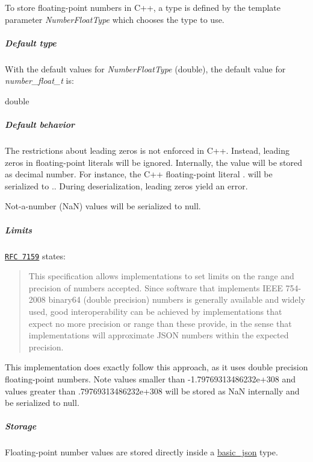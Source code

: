 To store floating-\/point numbers in C++, a type is defined by the template parameter {\itshape Number\+Float\+Type} which chooses the type to use.

\subparagraph*{Default type}

With the default values for {\itshape Number\+Float\+Type} ({\ttfamily double}), the default value for {\itshape number\+\_\+float\+\_\+t} is\+:


\begin{DoxyCode}
\textcolor{keywordtype}{double}
\end{DoxyCode}


\subparagraph*{Default behavior}


\begin{DoxyItemize}
\item The restrictions about leading zeros is not enforced in C++. Instead, leading zeros in floating-\/point literals will be ignored. Internally, the value will be stored as decimal number. For instance, the C++ floating-\/point literal {.} will be serialized to {.}. During deserialization, leading zeros yield an error.
\item Not-\/a-\/number (Na\+N) values will be serialized to {\ttfamily null}.
\end{DoxyItemize}

\subparagraph*{Limits}

\href{http://rfc7159.net/rfc7159}{\tt R\+F\+C 7159} states\+: \begin{quote}
This specification allows implementations to set limits on the range and precision of numbers accepted. Since software that implements I\+E\+E\+E 754-\/2008 binary64 (double precision) numbers is generally available and widely used, good interoperability can be achieved by implementations that expect no more precision or range than these provide, in the sense that implementations will approximate J\+S\+O\+N numbers within the expected precision. \end{quote}


This implementation does exactly follow this approach, as it uses double precision floating-\/point numbers. Note values smaller than {\ttfamily -\/1.\+79769313486232e+308} and values greater than {.\+79769313486232e+308} will be stored as Na\+N internally and be serialized to {\ttfamily null}.

\subparagraph*{Storage}

Floating-\/point number values are stored directly inside a \hyperlink{classnlohmann_1_1basic__json}{basic\+\_\+json} type.

